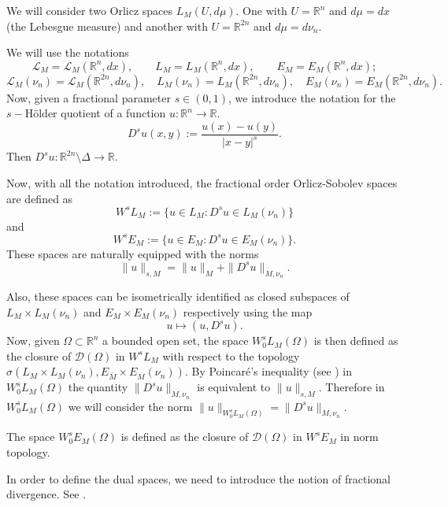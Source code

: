\documentclass{amsart}
\newcommand{\R}{{\mathbb R}}
\newcommand{\LL}{{\mathcal L}}
\theoremstyle{remark}
\theoremstyle{definition}
\numberwithin{equation}{section}
\begin{document}
We will consider two Orlicz spaces $L_M(U,d\mu)$. One with $U=\R^n$ and $d\mu=dx$ (the Lebesgue measure) and another with $U=\R^{2n}$ and $d\mu = d\nu_n$. 

We will use the notations
$$
\LL_M = \LL_M(\R^n, dx), \qquad L_M = L_M(\R^n, dx),\qquad E_M = E_M(\R^n, dx);
$$
$$
\LL_M(\nu_n) = \LL_M(\R^{2n}, d\nu_n), \quad L_M(\nu_n) = L_M(\R^{2n}, d\nu_n),\quad E_M(\nu_n) = E_M(\R^{2n}, d\nu_n).
$$
Now, given a fractional parameter $s\in (0,1)$, we introduce the notation for the $s-$H\"older quotient of a function $u\colon\R^n\to \R$.
$$
D^su(x,y) := \frac{u(x)-u(y)}{|x-y|^s}.
$$
Then $D^su\colon \R^{2n}\setminus \Delta\to \R$.

Now, with all the notation introduced, the fractional order Orlicz-Sobolev spaces are defined as
$$
W^sL_M := \{u\in L_M\colon D^s u\in L_M(\nu_n)\}
$$
and
$$
W^sE_M :=\{u\in E_M\colon D^su\in E_M(\nu_n)\}.
$$
These spaces are naturally equipped with the norms
$$
\|u\|_{s,M} = \|u\|_M + \|D^su\|_{M,\nu_n}.
$$

Also, these spaces can be isometrically identified as closed subspaces of $L_M\times L_M(\nu_n)$ and $E_M\times E_M(\nu_n)$ respectively using the map
$$
u\mapsto (u, D^su).
$$
Now, given $\Omega\subset\R^n$ a bounded open set, the space $W^s_0L_M(\Omega)$ is then defined as the closure of ${\mathcal D}(\Omega)$ in $W^sL_M$ with respect to the topology $\sigma(L_M\times L_M(\nu_n), E_{\bar M}\times E_{\bar M}(\nu_n))$. By Poincar\'e's inequality (see \cite[Corollary 6.2]{FBS}) in  $W_0^s L_M(\Omega)$ the quantity $\|D^su\|_{M,\nu_n}$ is equivalent to $\|u\|_{s, M}$. Therefore in $W_0^s L_M(\Omega)$ we will consider the norm $\|u\|_{W^s_0L_M(\Omega)} = \|D^su\|_{M,\nu_n}$.

The space $W^s_0 E_M(\Omega)$ is defined as the closure of ${\mathcal D}(\Omega)$ in $W^sE_M$ in norm topology.

In order to define the dual spaces, we need to introduce the notion of fractional divergence. See \cite{FBSaRi}.
\end{document}
